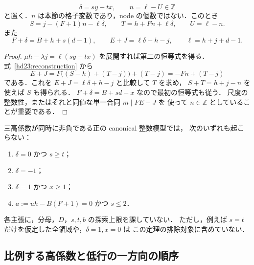 \begin{lemma}[非対称量と一つの整数格子変数]
\label{hd23:lattice}
\[
 \delta=sy-tx,\qquad n=\ell-U\in\mathbb Z
\]
と置く．$n$ は本節の格子変数であり，node の個数ではない．このとき
\begin{equation}\label{hd23:lattice-form}
 \boxed{\quad
 S=j-(F+1)n-\ell\delta,\qquad
 T=h+Fn+\ell\delta,\qquad U=\ell-n.
 \quad}
\end{equation}
また
\begin{equation}\label{hd23:F-delta}
 F+\delta=B+h+s(d-1),\qquad
 E+J=\ell\delta+h-j,\qquad \ell=h+j+d-1.
\end{equation}
\end{lemma}

\begin{proof}
$\mu h-\lambda j=\ell(sy-tx)$ を展開すれば第二の恒等式を得る．
式~\eqref{hd23:reconstruction} から
\[
 E+J=F\bigl((S-h)+(T-j)\bigr)+(T-j)
       =-Fn+(T-j)
\]
である．これを $E+J=\ell\delta+h-j$ と比較して $T$ を求め，
$S+T=h+j-n$ を使えば $S$ も得られる．
$F+\delta=B+sd-x$ なので最初の恒等式も従う．
尺度の整数性，またはそれと同値な単一合同 $m\mid FE-J$ を
使って $n\in\mathbb Z$ としていることが重要である．
\end{proof}

\begin{theorem}[四つの無上界排除領域]
\label{hd23:main}
三高係数が同時に非負である正の canonical 整数模型では，
次のいずれも起こらない：
\begin{enumerate}
 \item $\delta=0$ かつ $s\ge t$；
 \item $\delta=-1$；
 \item $\delta=1$ かつ $x\ge1$；
 \item $a:=uh-B(F+1)=0$ かつ $s\le2$．
\end{enumerate}
各主張に，分母，$D$，$s,t,b$ の探索上限を課していない．
ただし，例えば $s=t$ だけを仮定した全領域や，$\delta=1,x=0$ は
この定理の排除対象に含めていない．
\end{theorem}

\subsection{比例する高係数と低行の一方向の順序}

